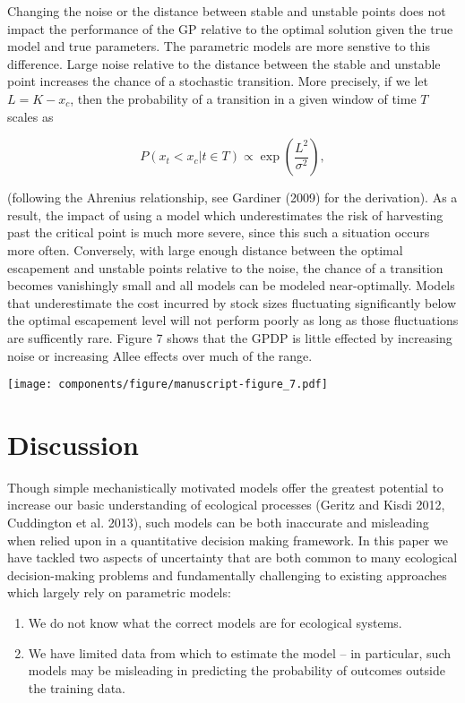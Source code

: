 \documentclass[]{components/elsarticle}
\begin{document}
Changing the noise or the distance between stable and unstable points
does not impact the performance of the GP relative to the optimal
solution given the true model and true parameters. The parametric models
are more senstive to this difference. Large noise relative to the
distance between the stable and unstable point increases the chance of a
stochastic transition. More precisely, if we let $L = K - x_c$, then the
probability of a transition in a given window of time $T$ scales as

\[P(x_t < x_c | t \in T) \propto  \exp\left(\frac{L^2}{\sigma^2}\right),\]

(following the Ahrenius relationship, see Gardiner (2009) for the
derivation). As a result, the impact of using a model which
underestimates the risk of harvesting past the critical point is much
more severe, since this such a situation occurs more often. Conversely,
with large enough distance between the optimal escapement and unstable
points relative to the noise, the chance of a transition becomes
vanishingly small and all models can be modeled near-optimally. Models
that underestimate the cost incurred by stock sizes fluctuating
significantly below the optimal escapement level will not perform poorly
as long as those fluctuations are sufficently rare. Figure 7 shows that
the GPDP is little effected by increasing noise or increasing Allee
effects over much of the range.

\texttt{[image: components/figure/manuscript-figure\_7.pdf]}

\section{Discussion}\label{discussion}

Though simple mechanistically motivated models offer the greatest
potential to increase our basic understanding of ecological processes
(Geritz and Kisdi 2012, Cuddington et al. 2013), such models can be both
inaccurate and misleading when relied upon in a quantitative decision
making framework. In this paper we have tackled two aspects of
uncertainty that are both common to many ecological decision-making
problems and fundamentally challenging to existing approaches which
largely rely on parametric models:

\begin{enumerate}
\def\labelenumi{\arabic{enumi}.}
\itemsep1pt\parskip0pt
\item
  We do not know what the correct models are for ecological systems.
\item
  We have limited data from which to estimate the model -- in
  particular, such models may be misleading in predicting the
  probability of outcomes outside the training data.
\end{enumerate}
\end{document}
